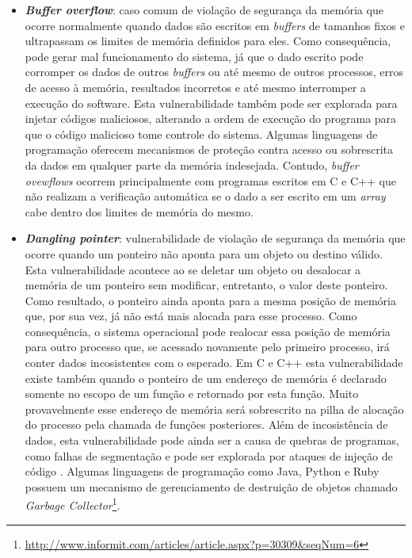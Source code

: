 \begin{itemize}
\item \textbf{\emph{Buffer overflow}}: caso comum de violação de segurança da memória que ocorre normalmente quando dados são escritos em \emph{buffers} de tamanhos fixos e ultrapassam os limites de memória definidos para eles. Como consequência, pode gerar mal funcionamento do sistema, já que o dado escrito pode corromper os dados de outros \emph{buffers} ou até mesmo de outros processos, erros de acesso à memória, resultados incorretos e até mesmo interromper a execução do software. Esta vulnerabilidade também pode ser explorada para injetar códigos maliciosos, alterando a ordem de execução do programa para que o código malicioso tome controle do sistema. Algumas linguagens de programação oferecem mecanismos de proteção contra acesso ou sobrescrita da dados em qualquer parte da memória indesejada. Contudo, \emph{buffer ovewflows} ocorrem principalmente com programas escritos em C e C++ que não realizam a verificação automática se o dado a ser escrito em um \emph{array} cabe dentro dos limites de memória do mesmo.

\item \textbf{\emph{Dangling pointer}}: vulnerabilidade de violação de segurança da memória que ocorre quando um ponteiro não aponta para um objeto ou destino válido. Esta vulnerabilidade acontece ao se deletar um objeto ou desalocar a memória de um ponteiro sem modificar, entretanto, o valor deste ponteiro. Como resultado, o ponteiro ainda aponta para a mesma posição de memória que, por sua vez, já não está mais alocada para esse processo. Como consequência, o sistema operacional pode realocar essa posição de memória para outro processo que, se acessado novamente pelo primeiro processo, irá conter dados incosistentes com o esperado. Em C e C++ esta vulnerabilidade existe também quando o ponteiro de um endereço de memória é declarado somente no escopo de um função e retornado por esta função. Muito provavelmente esse endereço de memória será sobrescrito na pilha de alocação do processo pela chamada de funções posteriores. Além de incosistência de dados, esta vulnerabilidade pode ainda ser a causa de quebras de programas, como falhas de segmentação e pode ser explorada por ataques de injeção de código \cite{afek2007}. Algumas linguagens de programação como Java, Python e Ruby possuem um mecanismo de gerenciamento de destruição de objetos chamado \emph{Garbage Collector}\footnote{\url{http://www.informit.com/articles/article.aspx?p=30309&seqNum=6}}. 


\end{itemize}
